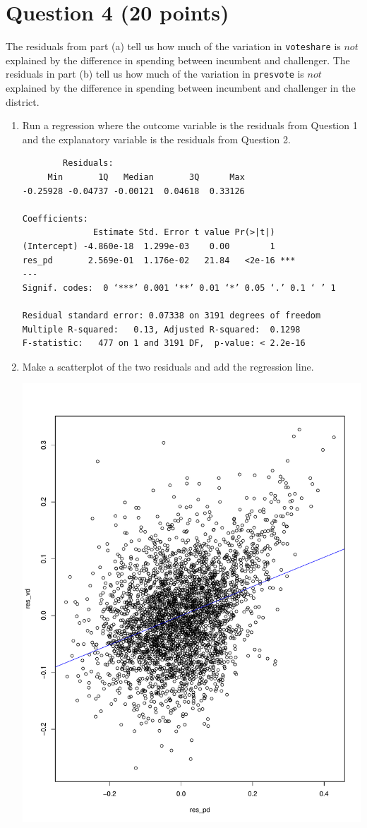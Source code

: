 \documentclass[12pt,letterpaper]{article}
\begin{document}
\newpage	
\section*{Question 4 (20 points)}
\noindent The residuals from part (a) tell us how much of the variation in \texttt{voteshare} is $not$ explained by the difference in spending between incumbent and challenger. The residuals in part (b) tell us how much of the variation in \texttt{presvote} is $not$ explained by the difference in spending between incumbent and challenger in the district.
	\begin{enumerate}
		\item Run a regression where the outcome variable is the residuals from Question 1 and the explanatory variable is the residuals from Question 2.
		
		\begin{verbatim}
		Residuals:
     Min       1Q   Median       3Q      Max 
-0.25928 -0.04737 -0.00121  0.04618  0.33126 

Coefficients:
              Estimate Std. Error t value Pr(>|t|)    
(Intercept) -4.860e-18  1.299e-03    0.00        1    
res_pd       2.569e-01  1.176e-02   21.84   <2e-16 ***
---
Signif. codes:  0 ‘***’ 0.001 ‘**’ 0.01 ‘*’ 0.05 ‘.’ 0.1 ‘ ’ 1

Residual standard error: 0.07338 on 3191 degrees of freedom
Multiple R-squared:   0.13,	Adjusted R-squared:  0.1298 
F-statistic:   477 on 1 and 3191 DF,  p-value: < 2.2e-16
		\end{verbatim}
		
		\item Make a scatterplot of the two residuals and add the regression line. 
		
		\includegraphics[width=.75\textwidth]{plot_4.pdf}
		

\end{enumerate}
\end{document}
